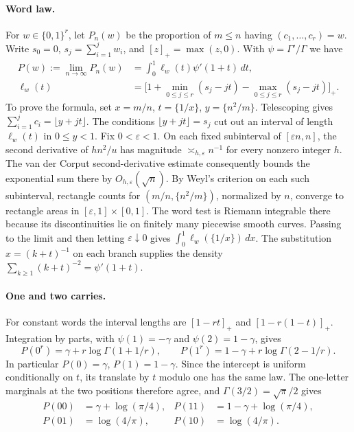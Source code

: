 \documentclass[11pt,a4paper,oneside,openany]{report}
\theoremstyle{remark}\newtheorem{remark}[theorem]{Remark}
\numberwithin{equation}{section}
\begin{document}
\paragraph{Word law.}
For $w\in\{0,1\}^r$, let $P_n(w)$ be the proportion of $m\le n$ having
$(c_1,\ldots,c_r)=w$. Write $s_0=0$, $s_j=\sum_{i=1}^j w_i$, and
$[z]_+=\max(z,0)$. With $\psi=\Gamma'/\Gamma$ we have
\begin{align*}
 P(w):=\lim_{n\to\infty}P_n(w)
 &=\int_0^1 \ell_w(t)\psi'(1+t)\,dt,\\
 \ell_w(t)&=\big[1+\min_{0\le j\le r}(s_j-jt)
                     -\max_{0\le j\le r}(s_j-jt)\big]_+ .
\end{align*}
To prove the formula, set $x=m/n$, $t=\{1/x\}$, $y=\{n^2/m\}$.
Telescoping gives $\sum_{i=1}^j c_i=\lfloor y+jt\rfloor$. The conditions
$\lfloor y+jt\rfloor=s_j$ cut out an interval of length $\ell_w(t)$ in
$0\le y<1$. Fix $0<\varepsilon<1$. On each fixed subinterval of
$[\varepsilon n,n]$, the second derivative of $h n^2/u$ has magnitude
$\asymp_{h,\varepsilon} n^{-1}$ for every nonzero integer $h$. The van der
Corput second-derivative estimate consequently bounds the exponential sum
there by $O_{h,\varepsilon}(\sqrt n)$. By Weyl's criterion on each such
subinterval, rectangle counts for $(m/n,\{n^2/m\})$, normalized by $n$,
converge to rectangle areas in $[\varepsilon,1]\times[0,1]$. The word test
is Riemann integrable there because its discontinuities lie on finitely many
piecewise smooth curves. Passing to the limit and then letting
$\varepsilon\downarrow0$ gives $\int_0^1\ell_w(\{1/x\})\,dx$.
The substitution $x=(k+t)^{-1}$ on each branch supplies the density
$\sum_{k\ge1}(k+t)^{-2}=\psi'(1+t)$.

\paragraph{One and two carries.}
For constant words the interval lengths are $[1-rt]_+$ and
$[1-r(1-t)]_+$. Integration by parts, with $\psi(1)=-\gamma$ and
$\psi(2)=1-\gamma$, gives
\[
 P(0^r)=\gamma+r\log\Gamma(1+1/r),\qquad
 P(1^r)=1-\gamma+r\log\Gamma(2-1/r).
\]
In particular $P(0)=\gamma$, $P(1)=1-\gamma$. Since the intercept is
uniform conditionally on $t$, its translate by $t$ modulo one has the
same law. The one-letter marginals at the two positions therefore agree,
and $\Gamma(3/2)=\sqrt\pi/2$ gives
\begin{align*}
 P(00)&=\gamma+\log(\pi/4), & P(11)&=1-\gamma+\log(\pi/4),\\
 P(01)&=\log(4/\pi), & P(10)&=\log(4/\pi).
\end{align*}
\end{document}
